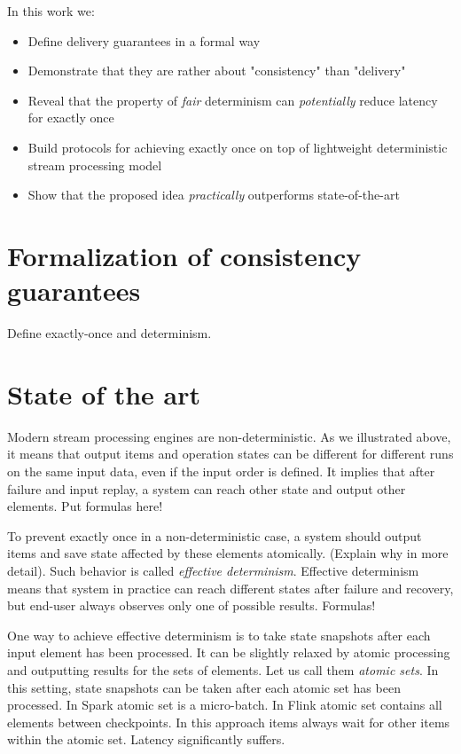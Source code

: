 \documentclass[sigconf]{acmart}
\theoremstyle{remark}
\begin{document}
In this work we:
\begin{itemize}
    \item Define delivery guarantees in a formal way
    \item Demonstrate that they are rather about "consistency" than "delivery"
    \item Reveal that the property of {\em fair} determinism can  {\em potentially} reduce latency for exactly once
    \item Build protocols for achieving exactly once on top of lightweight deterministic stream processing model 
    \item Show that the proposed idea {\em practically} outperforms state-of-the-art 
\end{itemize}

\section{Formalization of consistency guarantees}

Define exactly-once and determinism.

\section{State of the art}

Modern stream processing engines are non-deterministic. As we illustrated above, it means that output items and operation states can be different for different runs on the same input data, even if the input order is defined. It implies that after failure and input replay, a system can reach other state and output other elements. Put formulas here!

To prevent exactly once in a non-deterministic case, a system should output items and save state affected by these elements atomically. (Explain why in more detail). Such behavior is called {\em effective determinism}. Effective determinism means that system in practice can reach different states after failure and recovery, but end-user always observes only one of possible results. Formulas! 

One way to achieve effective determinism is to take state snapshots after each input element has been processed. It can be slightly relaxed by atomic processing and outputting results for the sets of elements. Let us call them {\em atomic sets}. In this setting, state snapshots can be taken after each atomic set has been processed. In Spark atomic set is a micro-batch. In Flink atomic set contains all elements between checkpoints. In this approach items always wait for other items within the atomic set. Latency significantly suffers.    
\end{document}
